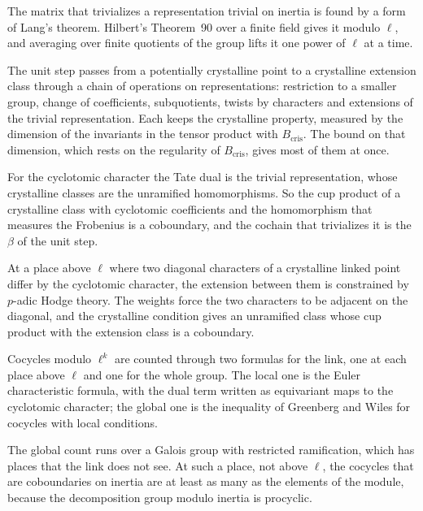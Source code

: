 The matrix that trivializes a representation trivial on inertia is found by a form of Lang's theorem. Hilbert's Theorem~90 over a finite field gives it modulo $\ell$, and averaging over finite quotients of the group lifts it one power of $\ell$ at a time.

The unit step passes from a potentially crystalline point to a crystalline extension class through a chain of operations on representations: restriction to a smaller group, change of coefficients, subquotients, twists by characters and extensions of the trivial representation. Each keeps the crystalline property, measured by the dimension of the invariants in the tensor product with $B_{\mathrm{cris}}$. The bound on that dimension, which rests on the regularity of $B_{\mathrm{cris}}$, gives most of them at once.

For the cyclotomic character the Tate dual is the trivial representation, whose crystalline classes are the unramified homomorphisms. So the cup product of a crystalline class with cyclotomic coefficients and the homomorphism that measures the Frobenius is a coboundary, and the cochain that trivializes it is the $\beta$ of the unit step.

At a place above $\ell$ where two diagonal characters of a crystalline linked point differ by the cyclotomic character, the extension between them is constrained by $p$-adic Hodge theory. The weights force the two characters to be adjacent on the diagonal, and the crystalline condition gives an unramified class whose cup product with the extension class is a coboundary.

Cocycles modulo $\ell^k$ are counted through two formulas for the link, one at each place above $\ell$ and one for the whole group. The local one is the Euler characteristic formula, with the dual term written as equivariant maps to the cyclotomic character; the global one is the inequality of Greenberg and Wiles for cocycles with local conditions.

The global count runs over a Galois group with restricted ramification, which has places that the link does not see. At such a place, not above $\ell$, the cocycles that are coboundaries on inertia are at least as many as the elements of the module, because the decomposition group modulo inertia is procyclic.


